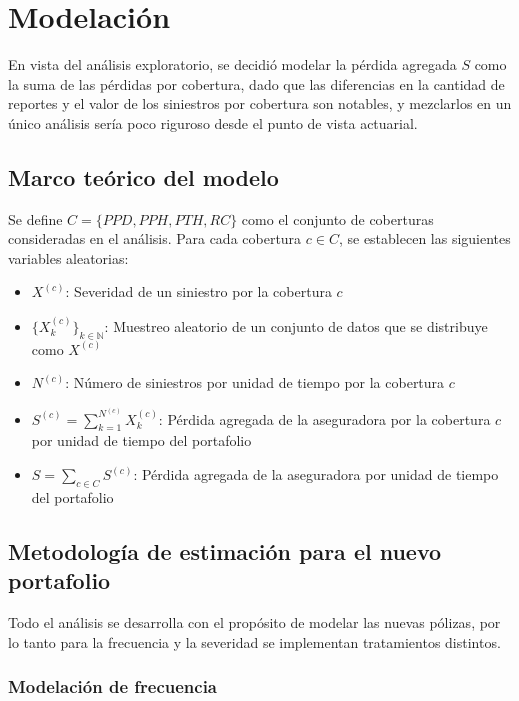 \section{Modelación}

En vista del análisis exploratorio, se decidió modelar la pérdida agregada $S$ como la suma de las pérdidas por cobertura, dado que las diferencias en la cantidad de reportes y el valor de los siniestros por cobertura son notables, y mezclarlos en un único análisis sería poco riguroso desde el punto de vista actuarial.

\subsection{Marco teórico del modelo}

Se define $C = \{PPD, PPH, PTH, RC\}$ como el conjunto de coberturas consideradas en el análisis. Para cada cobertura $c \in C$, se establecen las siguientes variables aleatorias:

\begin{itemize}
    \item $X^{(c)}$: Severidad de un siniestro por la cobertura $c$
    \item $\{X^{(c)}_k\}_{k \in \mathbb{N}}$: Muestreo aleatorio de un conjunto de datos que se distribuye como $X^{(c)}$
    \item $N^{(c)}$: Número de siniestros por unidad de tiempo por la cobertura $c$
    \item $S^{(c)} = \sum_{k=1}^{N^{(c)}} X^{(c)}_k$: Pérdida agregada de la aseguradora por la cobertura $c$ por unidad de tiempo del portafolio
    \item $S = \sum_{c \in C} S^{(c)}$: Pérdida agregada de la aseguradora por unidad de tiempo del portafolio
\end{itemize}

\subsection{Metodología de estimación para el nuevo portafolio}

Todo el análisis se desarrolla con el propósito de modelar las nuevas pólizas, por lo tanto para la frecuencia y la severidad se implementan tratamientos distintos.

\subsubsection{Modelación de frecuencia}

